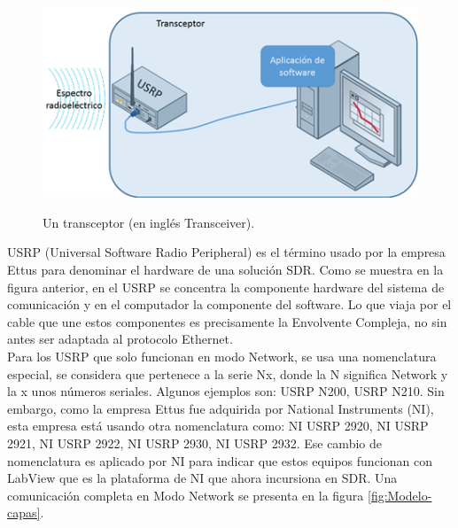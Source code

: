 \vspace{200px}
\begin{figure}[h!]
	\captionsetup{justification = raggedright, singlelinecheck = false}
	\caption{Un transceptor (en inglés Transceiver).} 
	\centering
	\includegraphics[scale=0.8]{Imagenes/Transceptor.png}
	\label{fig:Transceptor}
\end{figure}

USRP (Universal Software Radio Peripheral) es el término usado por la empresa Ettus para denominar el hardware de una solución SDR. Como se muestra en la figura anterior, en el USRP se concentra la componente hardware del sistema de comunicación y en el computador la componente del software. Lo que viaja por el cable que une estos componentes es precisamente la Envolvente Compleja, no sin antes ser adaptada al protocolo Ethernet.\\

Para los USRP que solo funcionan en modo Network, se usa una nomenclatura especial, se considera que pertenece a la serie Nx, donde la N significa Network y la x unos números seriales. Algunos ejemplos son:  USRP N200, USRP N210. Sin embargo, como la empresa Ettus fue adquirida por National Instruments (NI), esta empresa está usando otra nomenclatura como: NI USRP 2920, NI USRP 2921, NI USRP 2922, NI USRP 2930, NI USRP 2932. Ese cambio de nomenclatura es aplicado por NI para indicar que estos equipos funcionan con LabView que es la plataforma de NI que ahora incursiona en SDR. Una comunicación completa en Modo Network se presenta en la figura \ref{fig:Modelo-capas}.\\

